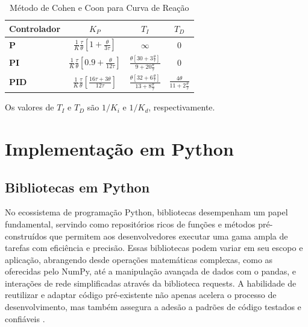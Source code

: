 \begin{table}[h]
    \begin{center}
        \begin{tabular}{ | l | c | c | c | }
            \hline
            {\textbf{Controlador}} & {$K_P$}                               & {$T_I$}                & {$T_D$}       \\
            \hline
            {\textbf{P}}           & {$\frac{1}{K}\frac{\tau}{\theta}[1+\frac{\theta}{3\tau}]$}    & {$\infty$}             & {$0$}         \\
            \hline
            {\textbf{PI}}          & {$\frac{1}{K}\frac{\tau}{\theta}[0.9+\frac{\theta}{12\tau}]$} & {$\frac{\theta [30+3 \frac{\theta}{\tau}]}{9+20 \frac{\theta}{\tau}}$} & {$0$}         \\
            \hline
            {\textbf{PID}}         & {$\frac{1}{K}\frac{\tau}{\theta}[\frac{16\tau+3\theta}{12\tau}]$} & {$\frac{\theta [32+6 \frac{\theta}{\tau}]}{13+8 \frac{\theta}{\tau}}$}            & {$\frac{4 \theta}{11+2 \frac{\theta}{\tau}}$} \\
            \hline
        \end{tabular}
        \caption{Método de Cohen e Coon para Curva de Reação}
        \label{tab:cccntb}
    \end{center}
\end{table}

Os valores de $T_I$ e $T_D$ são $1/K_i$ e $1/K_d$, respectivamente.

\section{Implementação em {Python}}

\subsection{Bibliotecas em {Python}}

No ecossistema de programação {Python}, bibliotecas desempenham um papel fundamental, servindo como repositórios ricos de
funções e métodos pré-construídos que permitem aos desenvolvedores executar uma gama ampla de tarefas com eficiência e
precisão.
Essas bibliotecas podem variar em seu escopo e aplicação, abrangendo desde operações matemáticas complexas, como as
oferecidas pelo NumPy, até a manipulação avançada de dados com o pandas, e interações de rede simplificadas através da
biblioteca requests.
A habilidade de reutilizar e adaptar código pré-existente não apenas acelera o processo de desenvolvimento, mas também
assegura a adesão a padrões de código testados e confiáveis \cite{pipy,pydocs} .

